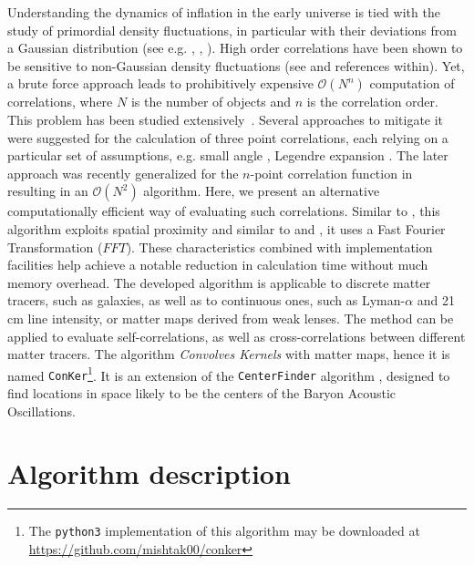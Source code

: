 \documentclass{aa}
\begin{document}
Understanding the dynamics of inflation in the early universe is tied with the study of primordial density fluctuations, in particular with their deviations from a Gaussian distribution (see e.g. \cite{Maldacena:2002vr}, \cite{Bartolo:2004if}, \cite{Acquaviva:2002ud}).
High order correlations have been shown to be sensitive to non-Gaussian density fluctuations  (see \cite{Meerburg:2019qqi} and references within). Yet, a brute force approach leads to prohibitively expensive $\mathcal{O}(N^n)$ computation of correlations, where $N$ is the number of objects and $n$ is the correlation order. This problem has been studied extensively~\citep{MarchThesis}. Several approaches to mitigate it were suggested for the calculation of three point correlations, each relying on a particular set of assumptions, e.g. small angle \citep{Yuan:2018qek}, Legendre expansion \citep{Slepian:2015qza}. The later approach was recently generalized for the $n$-point correlation function in~\cite{philcox2021encore} resulting in an $\mathcal{O}(N^2)$ algorithm. Here, we present an alternative computationally efficient way of evaluating such correlations. Similar to \cite{MarchThesis}, this algorithm exploits spatial proximity and similar to \cite{zhang2011FFT} and \cite{Slepian:2015qwa}, it uses a Fast Fourier Transformation ($FFT$). These characteristics combined with implementation facilities help achieve a notable reduction in calculation time without much memory overhead. The developed algorithm is applicable to discrete matter tracers, such as galaxies, as well as to continuous ones, such as Lyman-$\alpha$ and 21 cm line intensity, or matter maps derived from weak lenses. The method can be applied to evaluate self-correlations, as well as cross-correlations between different matter tracers. The algorithm {\it Convolves Kernels} with matter maps, hence it is named {\tt ConKer}\footnote{The {\tt python3} implementation of this algorithm may be downloaded at \url{https://github.com/mishtak00/conker}}. It is an extension of the {\tt CenterFinder} algorithm \citep{brown2021algorithm}, designed to find locations in space likely to be the centers of the Baryon Acoustic Oscillations.

\section{Algorithm description} 
\label{sec:description}

\end{document}
